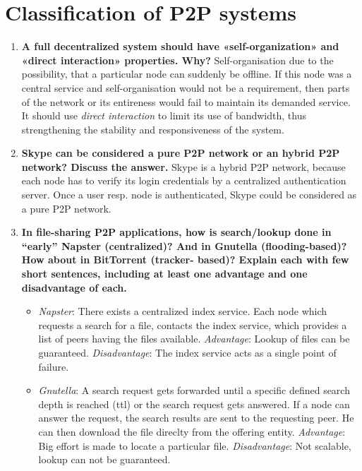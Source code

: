 \documentclass{article}
\begin{document}
\section{Classification of P2P systems}
  \begin{enumerate}[1]
    \item \textbf{A full decentralized system should have «self-organization» and «direct interaction» properties. Why?}
          Self-organisation due to the possibility, that a particular node can suddenly be offline. If this node was a central service
          and self-organisation would not be a requirement, then parts of the network or its entireness would fail to maintain its demanded service. \\
          It should use \textit{direct interaction} to limit its use of bandwidth, thus strengthening the stability and responsiveness of the system.
    \item \textbf{Skype can be considered a pure P2P network or an hybrid P2P network? Discuss the answer.}
          Skype is a hybrid P2P network, because each node has to verify its login credentials by a centralized authentication server.
          Once a user resp. node is authenticated, Skype could be considered as a pure P2P network.
    \item \textbf{In file-sharing P2P applications, how is search/lookup done in “early” Napster (centralized)? And in Gnutella (flooding-based)? How about in BitTorrent (tracker- based)? Explain each with few short sentences, including at least one advantage and one disadvantage of each.}
          \begin{itemize}
            \item \textit{Napster}: There exists a centralized index service. Each node which requests a search for a file, contacts the
                  index service, which provides a list of peers having the files available.
                  \textit{Advantage}: Lookup of files can be guaranteed.
                  \textit{Disadvantage}: The index service acts as a single point of failure.
            \item \textit{Gnutella}: A search request gets forwarded until a specific defined search depth is reached (ttl) or the search request gets answered.
                  If a node can answer the request, the search results are sent to the requesting peer. He can then download the file direclty from the offering entity.
                  \textit{Advantage}: Big effort is made to locate a particular file.
                  \textit{Disadvantage}: Not scalable, lookup can not be guaranteed.

\end{itemize}
\end{enumerate}
\end{document}
